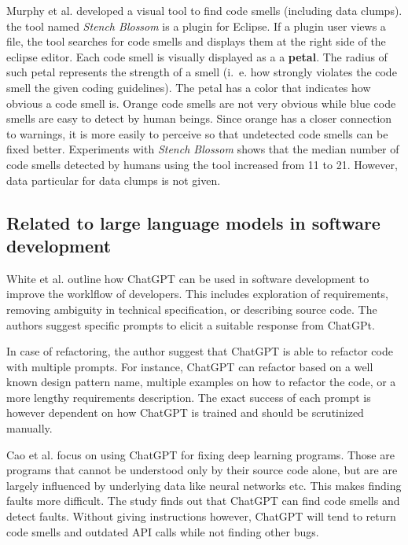 Murphy et al. \cite{stench_blossom} developed a visual tool to find code smells (including data clumps). the tool named \textit{Stench Blossom} is a plugin for Eclipse. If a plugin user views a file, the tool searches for code smells and displays them at the right side of the eclipse editor. Each code smell is visually displayed as a a \textbf{petal}. The radius of such petal represents the strength of a smell (i.~e. how strongly violates the code smell the given coding guidelines). The petal has a color that indicates how obvious a code smell is. Orange code smells are not very obvious while blue code smells are easy to detect by human beings. Since orange has a closer connection to warnings, it is more easily to perceive so that undetected code smells can be fixed better. Experiments with \textit{Stench Blossom} shows that the median number of code smells detected by humans using the tool increased from 11 to 21. However, data particular for data clumps is not given.  

\begin{comment}
Neto et al. developed an agent-based platform to detect and refactor code smells (including data clumps). The platform uses everal agents that work regularly to fix code smells. Each can obtain norms that describes what code smells it should fix, what conditions 
\end{comment}
\subsection{Related to large language models in software development}

White et al. \cite{White2023ChatGPTPP} outline how ChatGPT can be used in software development to improve the worklflow of developers. This includes  exploration of requirements, removing ambiguity in technical specification, or describing source code. The authors suggest specific prompts to elicit a suitable response from ChatGPt.

In case of refactoring, the author suggest that ChatGPT is able to refactor code with multiple prompts. For instance, ChatGPT can refactor based on a well known design pattern name, multiple examples on how to refactor the code, or a more lengthy requirements description. The exact success of each prompt is however dependent on how ChatGPT is trained and should be scrutinized manually. 

Cao et al. \cite{cao2023study} focus on using ChatGPT for fixing deep learning programs. Those are programs that cannot be understood only by their source code alone, but are are largely influenced by underlying data like  neural networks etc. This makes finding faults more difficult. The study finds out that ChatGPT can find code smells and detect faults. Without giving instructions however, ChatGPT will tend to return code smells and outdated API calls while not finding other bugs. 
